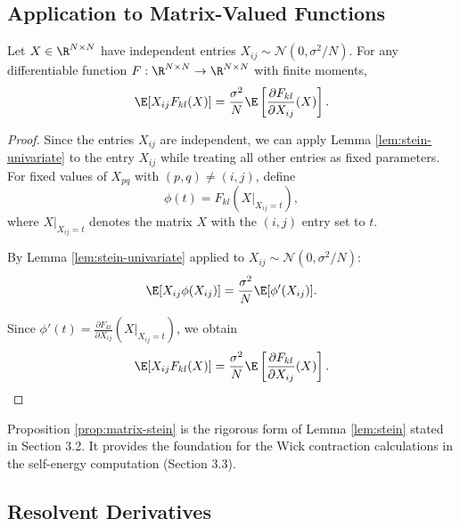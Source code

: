 \subsection{Application to Matrix-Valued Functions}

\begin{proposition}\label{prop:matrix-stein}
Let $X \in \R^{N \times N}$ have independent entries $X_{ij} \sim \mathcal{N}(0, \sigma^2/N)$. For any differentiable function $F: \R^{N \times N} \to \R^{N \times N}$ with finite moments,
\begin{equation}\label{eq:matrix-stein}
\E[X_{ij} F_{kl}(X)] = \frac{\sigma^2}{N} \E\left[\frac{\partial F_{kl}}{\partial X_{ij}}(X)\right].
\end{equation}
\end{proposition}

\begin{proof}
Since the entries $X_{ij}$ are independent, we can apply Lemma \ref{lem:stein-univariate} to the entry $X_{ij}$ while treating all other entries as fixed parameters. For fixed values of $X_{pq}$ with $(p,q) \neq (i,j)$, define
\[
\phi(t) = F_{kl}(X|_{X_{ij} = t}),
\]
where $X|_{X_{ij} = t}$ denotes the matrix $X$ with the $(i,j)$ entry set to $t$.

By Lemma \ref{lem:stein-univariate} applied to $X_{ij} \sim \mathcal{N}(0, \sigma^2/N)$:
\begin{align}
\E[X_{ij} \phi(X_{ij})] = \frac{\sigma^2}{N} \E[\phi'(X_{ij})].
\end{align}

Since $\phi'(t) = \frac{\partial F_{kl}}{\partial X_{ij}}(X|_{X_{ij} = t})$, we obtain
\begin{align}
\E[X_{ij} F_{kl}(X)] = \frac{\sigma^2}{N} \E\left[\frac{\partial F_{kl}}{\partial X_{ij}}(X)\right].
\end{align}
\end{proof}

\begin{remark}
Proposition \ref{prop:matrix-stein} is the rigorous form of Lemma \ref{lem:stein} stated in Section 3.2. It provides the foundation for the Wick contraction calculations in the self-energy computation (Section 3.3).
\end{remark}

\subsection{Resolvent Derivatives}

